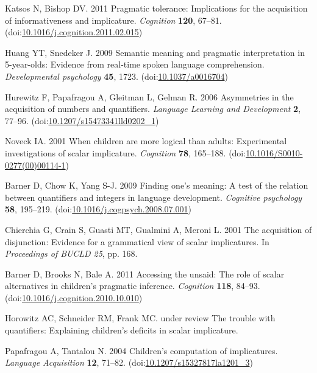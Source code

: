 \documentclass{rsos}
\begin{document}
\begin{thebibliography}{10}
\hypertarget{ref-katsos2011}{}
 Katsos N, Bishop DV. 2011 Pragmatic tolerance: Implications for the
acquisition of informativeness and implicature. \emph{Cognition}
\textbf{120}, 67--81.
(doi:\href{https://doi.org/10.1016/j.cognition.2011.02.015}{10.1016/j.cognition.2011.02.015})

\hypertarget{ref-huang2009b}{}
 Huang YT, Snedeker J. 2009 Semantic meaning and pragmatic
interpretation in 5-year-olds: Evidence from real-time spoken language
comprehension. \emph{Developmental psychology} \textbf{45}, 1723.
(doi:\href{https://doi.org/10.1037/a0016704}{10.1037/a0016704})

\hypertarget{ref-hurewitz2006}{}
  Hurewitz F, Papafragou A, Gleitman L, Gelman R. 2006 Asymmetries in
the acquisition of numbers and quantifiers. \emph{Language Learning and
Development} \textbf{2}, 77--96.
(doi:\href{https://doi.org/10.1207/s15473341lld0202_1}{10.1207/s15473341lld0202\_1})

\hypertarget{ref-noveck2001}{}
  Noveck IA. 2001 When children are more logical than adults:
Experimental investigations of scalar implicature. \emph{Cognition}
\textbf{78}, 165--188.
(doi:\href{https://doi.org/10.1016/S0010-0277(00)00114-1}{10.1016/S0010-0277(00)00114-1})

\hypertarget{ref-barner2009}{}
 Barner D, Chow K, Yang S-J. 2009 Finding one's meaning: A test of
the relation between quantifiers and integers in language development.
\emph{Cognitive psychology} \textbf{58}, 195--219.
(doi:\href{https://doi.org/10.1016/j.cogpsych.2008.07.001}{10.1016/j.cogpsych.2008.07.001})

\hypertarget{ref-chierchia2001}{}
  Chierchia G, Crain S, Guasti MT, Gualmini A, Meroni L. 2001 The
acquisition of disjunction: Evidence for a grammatical view of scalar
implicatures. In \emph{Proceedings of BUCLD 25}, pp. 168.

\hypertarget{ref-barner2011}{}
  Barner D, Brooks N, Bale A. 2011 Accessing the unsaid: The role of
scalar alternatives in children's pragmatic inference. \emph{Cognition}
\textbf{118}, 84--93.
(doi:\href{https://doi.org/10.1016/j.cognition.2010.10.010}{10.1016/j.cognition.2010.10.010})

\hypertarget{ref-horowitzSchneider}{}
 Horowitz AC, Schneider RM, Frank MC. under review The trouble with
quantifiers: Explaining children's deficits in scalar implicature.

\hypertarget{ref-papafragou2004}{}
 Papafragou A, Tantalou N. 2004 Children's computation of
implicatures. \emph{Language Acquisition} \textbf{12}, 71--82.
(doi:\href{https://doi.org/10.1207/s15327817la1201_3}{10.1207/s15327817la1201\_3})


\end{thebibliography}
\end{document}
